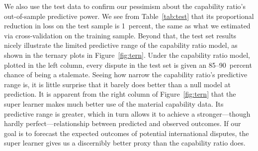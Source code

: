 We also use the test data to confirm our pessimism about the capability ratio's out-of-sample predictive power.
We see from Table~\ref{tab:test} that its proportional reduction in loss on the test sample is 1~percent, the same as what we estimated via cross-validation on the training sample.
Beyond that, the test set results nicely illustrate the limited predictive range of the capability ratio model, as shown in the ternary plots in Figure~\ref{fig:tern}.
Under the capability ratio model, plotted in the left column, every dispute in the test set is given an 85--90~percent chance of being a stalemate.
Seeing how narrow the capability ratio's predictive range is, it is little surprise that it barely does better than a null model at prediction.
It is apparent from the right column of Figure~\ref{fig:tern} that the super learner makes much better use of the material capability data.
Its predictive range is greater, which in turn allows it to achieve a stronger---though hardly perfect---relationship between predicted and observed outcomes.
If our goal is to forecast the expected outcomes of potential international disputes, the super learner gives us a discernibly better proxy than the capability ratio does.

